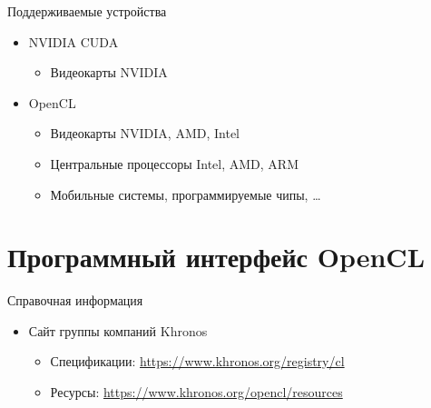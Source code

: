 \documentclass[@BEAMER_OPTIONS@]{beamer}
\newcommand{\www}[1]{\href{#1}{#1}}
\begin{document}

\begin{frame}{Поддерживаемые устройства}
    \begin{itemize}
        \item NVIDIA CUDA
            \begin{itemize}
                \item Видеокарты NVIDIA
            \end{itemize}
        \item OpenCL
            \begin{itemize}
                \item Видеокарты NVIDIA, AMD, Intel
                \item Центральные процессоры Intel, AMD, ARM
                \item Мобильные системы, программируемые чипы, \ldots
            \end{itemize}
    \end{itemize}
\end{frame}

\section{Программный интерфейс OpenCL}
\begin{frame}
    \sectionpage
\end{frame}

\begin{frame}{Справочная информация}
    \begin{itemize}
        \item Сайт группы компаний Khronos
            \begin{itemize}
                \item Спецификации: \www{https://www.khronos.org/registry/cl}
                \item Ресурсы: \www{https://www.khronos.org/opencl/resources}
            \end{itemize}
    \end{itemize}
\end{frame}
\end{document}

